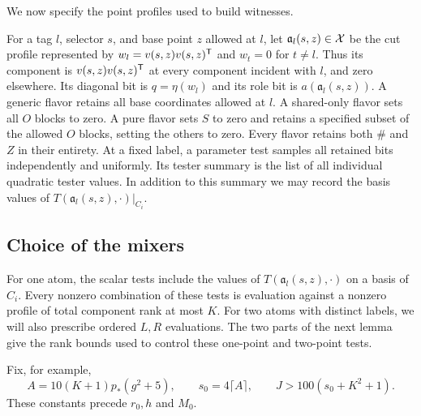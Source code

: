 We now specify the point profiles used to build witnesses.
\begin{definition}\label{def:atom}
For a tag $l$, selector $s$, and base point $z$ allowed at $l$,
let $\mathfrak a_l(s,z)\in\mathcal X$ be the cut profile represented
by $w_l=v(s,z)v(s,z)^{\mathsf T}$ and $w_t=0$ for $t\ne l$.
Thus its component is $v(s,z)v(s,z)^{\mathsf T}$ at every component
incident with $l$, and zero elsewhere.
Its diagonal bit is $q=\eta(w_l)$ and its role bit is
$a(\mathfrak a_l(s,z))$.
A generic flavor retains all base coordinates allowed at $l$.
A shared-only flavor sets all $O$ blocks to zero.  A pure flavor
sets $S$ to zero and retains a specified subset of the allowed
$O$ blocks, setting the others to zero.  Every flavor retains
both $\#$ and $Z$ in their entirety.
At a fixed label, a parameter test samples all retained bits
independently and uniformly.  Its tester summary is the list of
all individual quadratic tester values.  In addition to this
summary we may record the basis values of
$T(\mathfrak a_l(s,z),\cdot)|_{C_i}$.
\end{definition}

\subsection{Choice of the mixers}

For one atom, the scalar tests include the values of
$T(\mathfrak a_l(s,z),\cdot)$ on a basis of $C_i$.
Every nonzero combination of these tests is evaluation against
a nonzero profile of total
component rank at most $K$.  For two atoms with distinct labels,
we will also prescribe ordered $L,R$ evaluations.  The two parts
of the next lemma give the rank bounds used to control these
one-point and two-point tests.

Fix, for example,
\begin{equation}\label{eq:mixer-parameters}
 A=10(K+1)p_*(g^2+5),\qquad s_0=4\lceil A\rceil,
 \qquad J>100(s_0+K^2+1).
\end{equation}
These constants precede $r_0,h$ and $M_0$.

